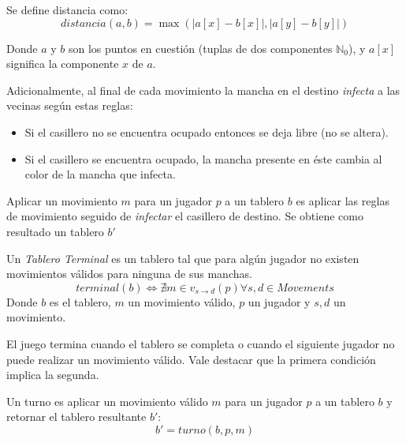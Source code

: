 \documentclass[10pt,a4paper,notitlepage]{article}
\newenvironment{definition}[1][Definición]{\begin{trivlist}
\item[\hskip \labelsep {\bfseries #1}]}{\end{trivlist}}
\begin{document}
\begin{definition}
Se define distancia como:
\begin{equation}
    distancia(a, b) = \max(|a[x] - b[x]|, |a[y] - b[y]|)
\end{equation}

Donde $a$ y $b$ son los puntos en cuestión (tuplas de dos componentes $\mathbb{N}_{0}$), y $a[x]$ significa la componente $x$ de $a$.
\end{definition}

Adicionalmente, al final de cada movimiento la mancha en el destino \textit{infecta} a las vecinas según estas reglas:
\begin{itemize}
\item Si el casillero no se encuentra ocupado entonces se deja libre (no se altera).
\item Si el casillero se encuentra ocupado, la mancha presente en éste cambia al color de la mancha que infecta.
\end{itemize}

\begin{definition}
Aplicar un movimiento $m$ para un jugador $p$ a un tablero $b$ es aplicar las reglas de movimiento seguido de \textit{infectar} el casillero de destino. Se obtiene como resultado un tablero $b'$
\end{definition}

\begin{definition}
Un \textit{Tablero Terminal} es un tablero tal que para algún jugador no existen movimientos válidos para ninguna de sus manchas.
\begin{equation}
terminal(b) \Leftrightarrow \nexists m \in v_{s \rightarrow d}(p) \forall s, d \in Movements
\end{equation}
Donde $b$ es el tablero, $m$ un movimiento válido, $p$ un jugador y $s, d$ un movimiento.
\end{definition}

El juego termina cuando el tablero se completa o cuando el siguiente jugador no puede realizar un movimiento válido. Vale destacar que la primera condición implica la segunda.

\begin{definition}
Un turno es aplicar un movimiento válido $m$ para un jugador $p$ a un tablero $b$ y retornar el tablero resultante $b'$:
\begin{equation}
b' = turno(b, p, m)
\end{equation}
\end{definition}
\end{document}
